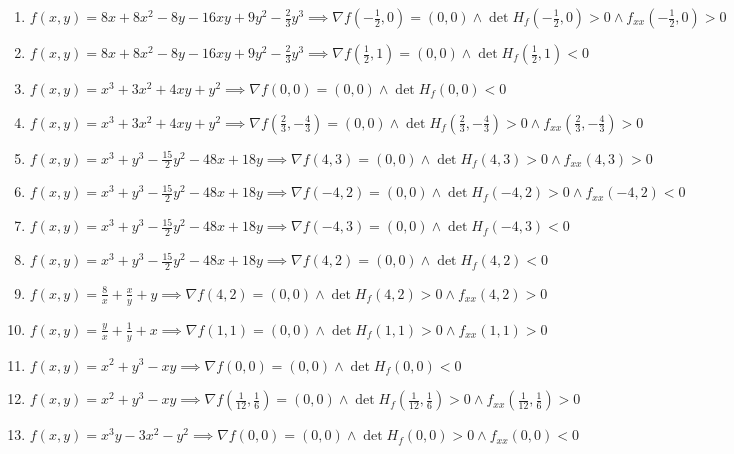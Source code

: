 \documentclass[11pt,a4paper]{article}
\begin{document}
\begin{enumerate}
\item $\displaystyle f(x, y) = 8x + 8x^{2} - 8y - 16xy + 9y^{2} - \frac{2}{3} y^{3} \implies \nabla f\left( -\frac{1}{2}, 0 \right) = (0, 0) \land \det H_{f}\left( -\frac{1}{2}, 0 \right) > 0 \land f_{xx}\left( -\frac{1}{2}, 0 \right) > 0$
\item $\displaystyle f(x, y) = 8x + 8x^{2} - 8y - 16xy + 9y^{2} - \frac{2}{3} y^{3} \implies \nabla f\left( \frac{1}{2}, 1 \right) = (0, 0) \land \det H_{f}\left( \frac{1}{2}, 1 \right) < 0$
\item $\displaystyle f(x, y) = x^{3} + 3x^{2} + 4xy + y^{2} \implies \nabla f(0, 0) = (0, 0) \land \det H_{f}(0, 0) < 0$
\item $\displaystyle f(x, y) = x^{3} + 3x^{2} + 4xy + y^{2} \implies \nabla f\left( \frac{2}{3}, -\frac{4}{3} \right) = (0, 0) \land \det H_{f}\left( \frac{2}{3}, -\frac{4}{3} \right) > 0 \land f_{xx}\left( \frac{2}{3}, -\frac{4}{3} \right) > 0$
\item $\displaystyle f(x, y) = x^{3} + y^{3} - \frac{15}{2} y^{2} - 48x + 18y \implies \nabla f(4, 3) = (0, 0) \land \det H_{f}(4, 3) > 0 \land f_{xx}(4, 3) > 0$
\item $\displaystyle f(x, y) = x^{3} + y^{3} - \frac{15}{2} y^{2} - 48x + 18y \implies \nabla f(-4, 2) = (0, 0) \land \det H_{f}(-4, 2) > 0 \land f_{xx}(-4, 2) < 0$
\item $\displaystyle f(x, y) = x^{3} + y^{3} - \frac{15}{2} y^{2} - 48x + 18y \implies \nabla f(-4, 3) = (0, 0) \land \det H_{f}(-4, 3) < 0$
\item $\displaystyle f(x, y) = x^{3} + y^{3} - \frac{15}{2} y^{2} - 48x + 18y \implies \nabla f(4, 2) = (0, 0) \land \det H_{f}(4, 2) < 0$
\item $\displaystyle f(x, y) = \frac{8}{x} + \frac{x}{y} + y \implies \nabla f(4, 2) = (0, 0) \land \det H_{f}(4, 2) > 0 \land f_{xx}(4, 2) > 0$
\item $\displaystyle f(x, y) = \frac{y}{x} + \frac{1}{y} + x \implies \nabla f(1, 1) = (0, 0) \land \det H_{f}(1, 1) > 0 \land f_{xx}(1, 1) > 0$
\item $\displaystyle f(x, y) = x^{2} + y^{3} - xy \implies \nabla f(0, 0) = (0, 0) \land \det H_{f}(0, 0) < 0$
\item $\displaystyle f(x, y) = x^{2} + y^{3} - xy \implies \nabla f\left( \frac{1}{12}, \frac{1}{6} \right) = (0, 0) \land \det H_{f}\left( \frac{1}{12}, \frac{1}{6} \right) > 0 \land f_{xx}\left( \frac{1}{12}, \frac{1}{6} \right) > 0$
\item $\displaystyle f(x, y) = x^{3} y - 3x^{2} - y^{2} \implies \nabla f(0, 0) = (0, 0) \land \det H_{f}(0, 0) > 0 \land f_{xx}(0, 0) < 0$

\end{enumerate}
\end{document}
